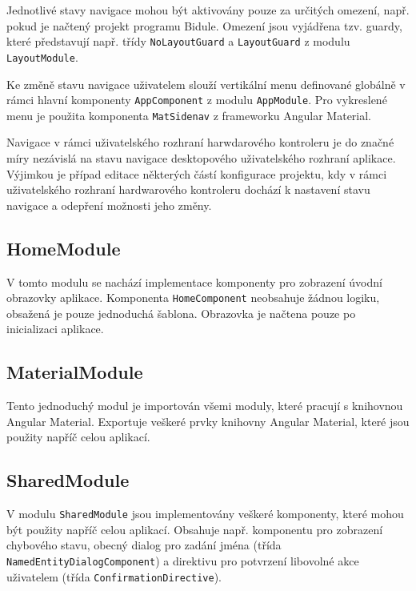 \documentclass[thesis=M,czech]{FITthesis}[2019/03/06]
\begin{document}
			Jednotlivé stavy navigace mohou být aktivovány pouze za určitých omezení, např. pokud je načtený projekt programu Bidule. 
			Omezení jsou vyjádřena tzv. guardy, které představují např. třídy \texttt{NoLayoutGuard} a \texttt{LayoutGuard} z modulu \texttt{LayoutModule}.
			
			Ke změně stavu navigace uživatelem slouží vertikální menu definované globálně v rámci hlavní komponenty \texttt{AppComponent} z modulu \texttt{AppModule}. Pro vykreslené menu je použita komponenta \texttt{MatSidenav} z frameworku Angular Material.
			
			Navigace v rámci uživatelského rozhraní harwdarového kontroleru je do značné míry nezávislá na stavu navigace desktopového uživatelského rozhraní aplikace.
			Výjimkou je případ editace některých částí konfigurace projektu, kdy v rámci uživatelského rozhraní hardwarového kontroleru dochází k nastavení stavu navigace a odepření možnosti jeho změny.
			
		\subsection{HomeModule}
			V tomto modulu se nachází implementace komponenty pro zobrazení úvodní obrazovky aplikace. Komponenta \texttt{HomeComponent}
			neobsahuje žádnou logiku, obsažená je pouze jednoduchá šablona. Obrazovka je načtena pouze po inicializaci aplikace.
			
		\subsection{MaterialModule}
			Tento jednoduchý modul je importován všemi moduly, které pracují s knihovnou Angular Material.
			Exportuje veškeré prvky knihovny Angular Material, které jsou použity napříč celou aplikací.
			
		\subsection{SharedModule}
			V modulu \texttt{SharedModule} jsou implementovány veškeré komponenty, které mohou být použity napříč celou aplikací.
			Obsahuje např. komponentu pro zobrazení chybového stavu, obecný dialog pro zadání jména (třída \texttt{Named\-Entity\-Dialog\-Component}) a direktivu pro potvrzení libovolné akce uživatelem (třída \texttt{Confirmation\-Directive}).
			
\end{document}
